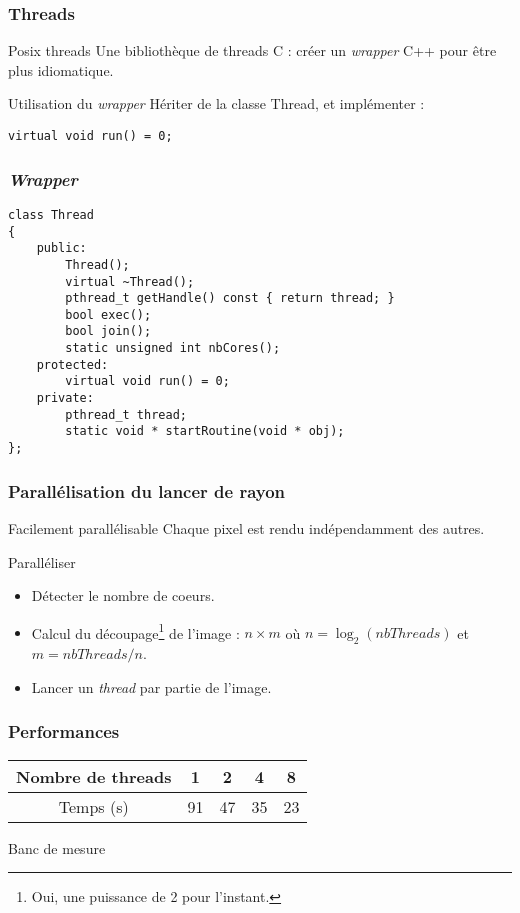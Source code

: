 \begin{frame}[fragile]
\frametitle{Threads}

\begin{block}{Posix threads}
Une bibliothèque de threads C : créer un \emph{wrapper} C++ pour être plus idiomatique.
\end{block}

\begin{block}{Utilisation du \emph{wrapper}}
Hériter de la classe Thread, et implémenter :
\begin{verbatim}
virtual void run() = 0;
\end{verbatim}
\end{block}

\end{frame}

\begin{frame}[fragile]
\frametitle{\emph{Wrapper}}
\begin{verbatim}
class Thread
{
    public:
        Thread();
        virtual ~Thread();
        pthread_t getHandle() const { return thread; }
        bool exec();
        bool join();
        static unsigned int nbCores();
    protected:
        virtual void run() = 0;
    private:
        pthread_t thread;
        static void * startRoutine(void * obj);
};
\end{verbatim}
\end{frame}


\begin{frame}
\frametitle{Parallélisation du lancer de rayon}

\begin{block}{Facilement parallélisable}
Chaque pixel est rendu indépendamment des autres.
\end{block}

\begin{block}{Paralléliser}
\begin{itemize}
\item Détecter le nombre de coeurs.
\item Calcul du découpage\footnote{Oui, une puissance de 2 pour l'instant.} de l'image : $n \times m $ où $ n = \log_2(nbThreads) $ et $ m = nbThreads / n$.
\item Lancer un \emph{thread} par partie de l'image.
\end{itemize}
\end{block}

\end{frame}

\begin{frame}
\frametitle{Performances}
\begin{tabular}{|c|c|c|c|c|}
\hline 
Nombre de threads & 1 & 2 & 4 & 8 \\ 
\hline 
Temps (s) & 91 & 47 & 35 & 23 \\ 
\hline 
\end{tabular} 
\begin{block}{Banc de mesure}
\end{block}

\end{frame}

